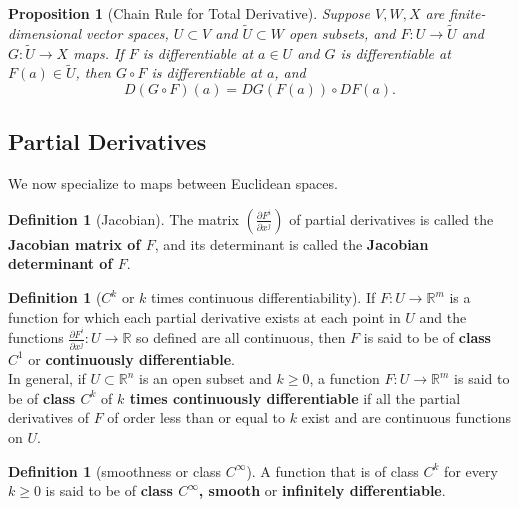 \documentclass[reqno]{amsart}
\theoremstyle{plain}%
\newtheorem{proposition}[theorem]{Proposition}
\theoremstyle{definition}
\newtheorem{definition}[theorem]{Definition}
\theoremstyle{remark}
\begin{document}
        \begin{proposition}[Chain Rule for Total
        Derivative]\label{chain-rule-total-derivative}
        Suppose $V,W,X$ are finite-dimensional vector spaces, $U \subset V$ and
        $\tilde{U}\subset W$ open subsets, and $F  \colon U \to \tilde{U}$ and
        $G  \colon \tilde{U} \to X$ maps. If $F$ is differentiable at
        $a \in U$ and $G$ is differentiable at $F(a) \in \tilde{U}$, then
        $G \circ F$ is differentiable at $a$, and
        \[
        D\left( G \circ F \right) (a) = DG\left( F(a) \right) \circ DF(a).
        \] 
        \end{proposition}

    \subsection*{Partial Derivatives}
        We now specialize to maps between Euclidean spaces.
        \begin{definition}[Jacobian]
            The matrix $\left( \frac{\partial F^{i}}{\partial x^{j}} \right) $ of
            partial derivatives is called the \textbf{Jacobian matrix of $F$}, and its
            determinant is called the \textbf{Jacobian determinant of $F$}.
        \end{definition}

        \begin{definition}[$C^{k}$ or $k$ times continuous differentiability]
        If $F  \colon U \to \mathbb{R}^{m}$ is a function for which each partial
        derivative exists at each point in $U$ and the functions
        $\frac{\partial F^{i}}{\partial x^{j}}  \colon U \to \mathbb{R}$ so defined
        are all continuous, then $F$ is said to be of
        \textbf{class $C^{1}$} or \textbf{continuously differentiable}.\\
        In general, if $U \subset \mathbb{R}^{n}$ is an open subset and $k \ge 0$,
        a function $F  \colon U \to \mathbb{R}^{m}$ is said to be of \textbf{class
        $C^{k}$} of \textbf{$k$ times continuously differentiable} if all the
        partial derivatives of $F$ of order less than or equal to $k$ exist and are
        continuous functions on $U$.
        \end{definition}

        \begin{definition}[smoothness or class $C^{\infty}$]
        A function that is of class $C^{k}$ for every $k \ge 0$ is said to be of
        \textbf{class $C^{\infty}$, smooth} or \textbf{infinitely differentiable}.
        \end{definition}
\end{document}

